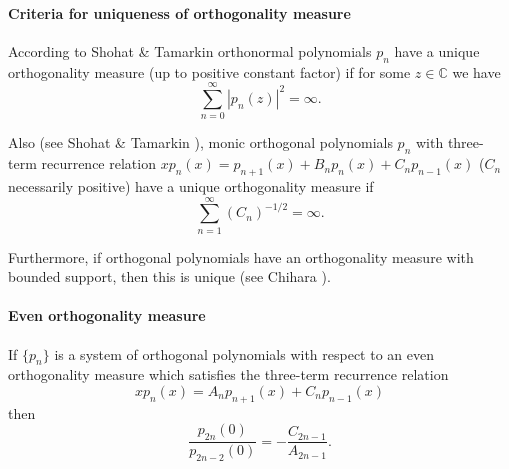 \documentclass[twoside,11pt]{article}
\newcommand\CC{\mathbb{C}}
\newcommand\iy\infty
\begin{document}
\paragraph{Criteria for uniqueness of orthogonality measure}
According to Shohat \& Tamarkin \cite[p.50]{K6}
orthonormal polynomials $p_n$ have a unique orthogonality measure (up to positive
constant factor) if
for some $z\in\CC$ we have
\begin{equation}
\sum_{n=0}^\iy |p_n(z)|^2 = \iy.
\label{90}
\end{equation}

Also (see Shohat \& Tamarkin \cite[p.59]{K6}),
monic orthogonal polynomials $p_n$ with three-term recurrence relation
$x p_n(x) = p_{n+1}(x)+B_n p_n(x)+C_n p_{n-1}(x)$
($C_n$ necessarily positive)
have a unique orthogonality measure if
\begin{equation}
\sum_{n=1}^\iy (C_n)^{-1/2}=\iy.
\label{93}
\end{equation}

Furthermore, if orthogonal polynomials have an orthogonality measure with
bounded support, then this is unique (see Chihara ).
%
\paragraph{Even orthogonality measure}
If $\{p_n\}$ is a system of orthogonal polynomials with respect to an even
orthogonality measure which satisfies the three-term recurrence relation
\begin{equation*}
x p_n(x)=A_n p_{n+1}(x)+C_n p_{n-1}(x)
\end{equation*}
then
\begin{equation}
\frac{p_{2n}(0)}{p_{2n-2}(0)}=- \frac{C_{2n-1}}{A_{2n-1}} .
\label{1}
\end{equation}
%
\end{document}

